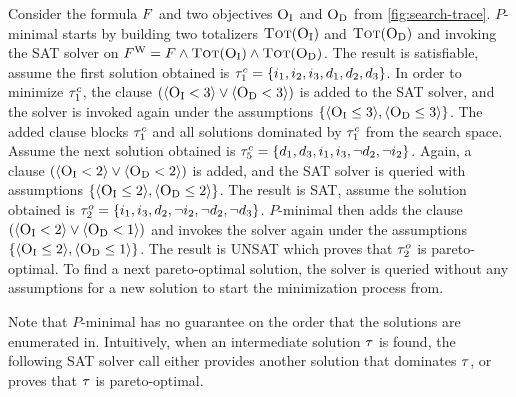 \begin{example}\label{ex:pmin}
  Consider the formula $F$ and two objectives $\textsc{O}_{\text{I}}$ and $\textsc{O}_{\text{D}}$ from \cref{fig:search-trace}.
  $P$-minimal starts by building two totalizers $\textsc{Tot}(\textsc{O}_{\text{I}})$ and $\textsc{Tot}(\textsc{O}_{\text{D}})$ and invoking the SAT solver on $F^\text{W} = F \land \textsc{Tot}(\textsc{O}_{\text{I}}) \land \textsc{Tot}(\textsc{O}_{\text{D}})$.
  The result is satisfiable, assume the first solution obtained is $\tau^c_1 = \{i_1, i_2, i_3, d_1, d_2, d_3\}$. 
  In order to minimize $\tau^c_1$, the clause $(\langle \textsc{O}_{\text{I}} < 3 \rangle \lor \langle \textsc{O}_{\text{D}} < 3 \rangle)$ is added to the SAT solver, and the solver is invoked again under the assumptions $\{ \langle \textsc{O}_{\text{I}} \leq 3 \rangle, \langle \textsc{O}_{\text{D}} \leq 3 \rangle \}$.
  The added clause blocks $\tau^c_1$ and all solutions dominated by $\tau^c_1$ from the search space.
  Assume the next solution obtained is $\tau^c_5 = \{d_1, d_3, i_1, i_3, \lnot d_2, \lnot i_2\}$. 
  Again, a clause $(\langle \textsc{O}_{\text{I}} < 2 \rangle \lor \langle \textsc{O}_{\text{D}} < 2 \rangle)$ is added, and the SAT solver is queried with assumptions $\{ \langle \textsc{O}_{\text{I}} \leq 2 \rangle, \langle \textsc{O}_{\text{D}} \leq 2 \rangle \}$.
  The result is SAT, assume the solution obtained is $\tau^o_2 = \{ i_1, i_3, d_2, \lnot i_2, \lnot d_2, \lnot d_3\}$. 
  $P$-minimal then adds the clause $(\langle \textsc{O}_{\text{I}} < 2 \rangle \lor \langle \textsc{O}_{\text{D}} < 1 \rangle)$ and invokes the solver again under the assumptions $\{ \langle \textsc{O}_{\text{I}} \leq 2 \rangle, \langle \textsc{O}_{\text{D}} \leq 1 \rangle \}$.
  The result is UNSAT which proves that $\tau^o_2$ is pareto-optimal. 
  To find a next pareto-optimal solution, the solver is queried without any assumptions for a new solution to start the minimization process from.
\end{example}

Note that $P$-minimal has no guarantee on the order that the solutions are enumerated in. 
Intuitively, when an intermediate solution $\tau$ is found, the following SAT solver call either provides another solution that dominates $\tau$, or proves that $\tau$ is pareto-optimal.  

